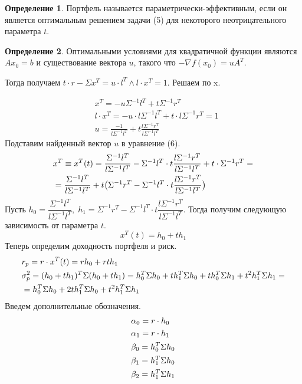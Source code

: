 \documentclass[12pt]{article}
\theoremstyle{definition}
\newtheorem{definition}{Определение}
\theoremstyle{remark}
\begin{document}
\begin{definition}
  Портфель называется параметрически-эффективным, если он является оптимальным решением задачи (5) для некоторого неотрицательного параметра $t$.
\end{definition}

\begin{definition}
  Оптимальными условиями для квадратичной функции являются $Ax_0=b$ и существование вектора $u$, такого что $-\nabla f(x_0)=u A^T$.
\end{definition}
Тогда получаем $t\cdot r - \Sigma x^T = u \cdot l^T \land l\cdot x^T=1$. Решаем по x.

\begin{align}
&x^T=-u\Sigma^{-1}l^T + t\Sigma^{-1}r^T\\
&l\cdot x^T = -u\cdot l\Sigma^{-1}l^T + t\cdot l\Sigma^{-1}r^T = 1\\
&u = \frac{-1}{l\Sigma^{-1}l^T} + t\frac{l\Sigma^{-1}r^T}{l\Sigma^{-1}l^T}
\end{align}
Подставим найденный вектор $u$ в уравнение (6).
\begin{align}
  &x^T\equiv x^T(t)=\frac{\Sigma^{-1}l^T}{l\Sigma^{-1}l^T} - \Sigma^{-1}l^T\cdot t\frac{l\Sigma^{-1}r^T}{l\Sigma^{-1}l^T} + t\cdot \Sigma^{-1}r^T=\\
  &=\frac{\Sigma^{-1}l^T}{l\Sigma^{-1}l^T} + t\big(\Sigma^{-1}r^T - \Sigma^{-1}l^T\cdot t\frac{l\Sigma^{-1}r^T}{l\Sigma^{-1}l^T}\big)\notag
\end{align}
Пусть $h_0=\dfrac{\Sigma^{-1}l^T}{l\Sigma^{-1}l^T},\;h_1=\Sigma^{-1}r^T - \Sigma^{-1}l^T\cdot t\dfrac{l\Sigma^{-1}r^T}{l\Sigma^{-1}l^T}$. Тогда
получим следующую зависимость от параметра $t$.
\begin{equation}
  x^T(t)=h_0+th_1
\end{equation}
Теперь определим доходность портфеля и риск.
\begin{align}
  &r_p=r\cdot x^T(t)=rh_0+rth_1\\
  &\sigma_p^2=(h_0+th_1)^T\Sigma (h_0+th_1)=h_0^T\Sigma h_0 + th_1^T\Sigma h_0 + th_0^T\Sigma h_1 + t^2h_1^T\Sigma h_1=\\
  &=h_0^T\Sigma h_0 + 2th_1^T\Sigma h_0 + t^2h_1^T\Sigma h_1 \notag
\end{align}
Введем дополнительные обозначения.
\begin{align}
  &\alpha_0=r\cdot h_0\notag\\
  &\alpha_1=r \cdot h_1\notag\\
  &\beta_0 = h_0^T\Sigma h_0\\
  &\beta_1 = h_1^T\Sigma h_0\notag\\
  &\beta_2 = h_1^T\Sigma h_1\notag
\end{align}
\end{document}

